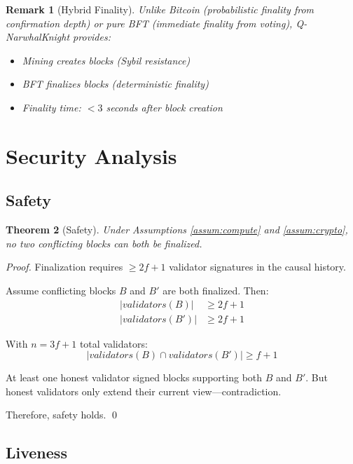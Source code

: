 \documentclass[11pt,a4paper]{article}
\newtheorem{theorem}{Theorem}[section]
\newtheorem{remark}[theorem]{Remark}
\begin{document}
\begin{remark}[Hybrid Finality]
Unlike Bitcoin (probabilistic finality from confirmation depth) or pure BFT (immediate finality from voting), Q-NarwhalKnight provides:
\begin{itemize}
    \item Mining creates blocks (Sybil resistance)
    \item BFT finalizes blocks (deterministic finality)
    \item Finality time: $< 3$ seconds after block creation
\end{itemize}
\end{remark}

\section{Security Analysis}

\subsection{Safety}

\begin{theorem}[Safety]
\label{thm:safety}
Under Assumptions \ref{assum:compute} and \ref{assum:crypto}, no two conflicting blocks can both be finalized.
\end{theorem}

\begin{proof}
Finalization requires $\geq 2f+1$ validator signatures in the causal history.

Assume conflicting blocks $B$ and $B'$ are both finalized. Then:
\begin{align}
    |validators(B)| &\geq 2f + 1 \\
    |validators(B')| &\geq 2f + 1
\end{align}

With $n = 3f + 1$ total validators:
\begin{equation}
    |validators(B) \cap validators(B')| \geq f + 1
\end{equation}

At least one honest validator signed blocks supporting both $B$ and $B'$. But honest validators only extend their current view---contradiction.

Therefore, safety holds. \qed
\end{proof}

\subsection{Liveness}
\end{document}

